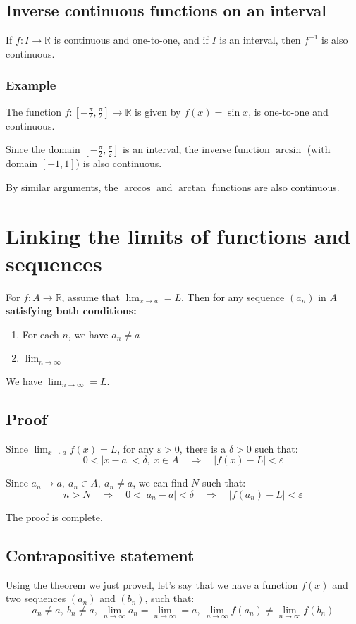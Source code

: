 \documentclass[11pt]{article}
\begin{document}
\subsection{Inverse continuous functions on an interval}
\label{sec:org3befb17}
If \(f : I \rightarrow \mathbb{R}\) is continuous and one-to-one, and if \(I\) is an interval, then \(f^{-1}\) is also continuous.
\subsubsection{Example}
\label{sec:org09ec2c8}
The function \(f : [-\frac{\pi}{2}, \frac{\pi}{2}] \rightarrow \mathbb{R}\) is given by \(f(x) = \sin x\), is one-to-one and continuous.


Since the domain \([-\frac{\pi}{2}, \frac{\pi}{2}]\) is an interval, the inverse function \(\arcsin\) (with domain \([-1, 1]\)) is also continuous.


By similar arguments, the \(\arccos\) and \(\arctan\) functions are also continuous.

\newpage
\section{Linking the limits of functions and sequences}
\label{sec:org89a6cb4}
For \(f : A \rightarrow \mathbb{R}\), assume that \(\lim_{x \rightarrow a} = L\). Then for any sequence \((a_n)\) in \(A\) \textbf{satisfying both conditions:}
\begin{enumerate}
\item For each \(n\), we have \(a_n \neq a\)
\item \(\lim_{n \rightarrow \infty}\)
\end{enumerate}

We have \(\lim_{n \rightarrow \infty} = L\).
\subsection{Proof}
\label{sec:orge2c3823}
Since \(\lim_{x \rightarrow a} f(x) = L\), for any \(\varepsilon > 0\), there is a \(\delta > 0\) such that:
\[0 < |x - a| < \delta, \ x \in A \quad \Rightarrow \quad |f(x) - L| < \varepsilon\]

Since \(a_n \rightarrow a, \ a_n \in A, \ a_n \neq a\), we can find \(N\) such that:
\[n > N \quad \Rightarrow \quad 0 < |a_n - a| < \delta \quad \Rightarrow \quad |f(a_n) - L| < \varepsilon\]

The proof is complete.
\subsection{Contrapositive statement}
\label{sec:org75f3fd3}
Using the theorem we just proved, let's say that we have a function \(f(x)\) and two sequences \((a_n)\) and \((b_n)\), such that:
\[a_n \neq a, \ b_n \neq a, \ \lim_{n \rightarrow \infty} a_n = \lim_{n \rightarrow \infty} = a, \ \lim_{n \rightarrow \infty} f(a_n) \neq \lim_{n \rightarrow \infty} f(b_n)\]
\end{document}
